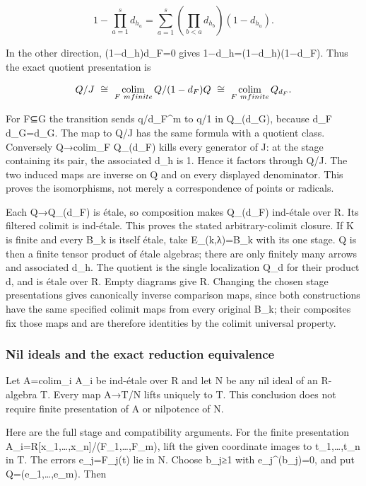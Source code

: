 \[
1-\prod_{a=1}^s d_{h_a}
 =\sum_{a=1}^s\left(\prod_{b<a}d_{h_b}\right)(1-d_{h_a}).
\]

In the other direction, (1−d\_h)d\_F=0 gives 1−d\_h=(1−d\_h)(1−d\_F). Thus the exact quotient presentation is

\[
Q/J\ \cong\ \mathop{\rm colim}_{F\ {m finite}}
     Q/(1-d_F)Q
\ \cong\ \mathop{\rm colim}_{F\ {m finite}} Q_{d_F}.
\]

For F⊆G the transition sends q/d\_F\^{}m to q/1 in Q\_(d\_G), because d\_F d\_G=d\_G. The map to Q/J has the same formula with a quotient class. Conversely Q→colim\_F Q\_(d\_F) kills every generator of J: at the stage containing its pair, the associated d\_h is 1. Hence it factors through Q/J. The two induced maps are inverse on Q and on every displayed denominator. This proves the isomorphisms, not merely a correspondence of points or radicals.

Each Q→Q\_(d\_F) is étale, so composition makes Q\_(d\_F) ind-étale over R. Its filtered colimit is ind-étale. This proves the stated arbitrary-colimit closure. If K is finite and every B\_k is itself étale, take E\_(k,λ)=B\_k with its one stage. Q is then a finite tensor product of étale algebras; there are only finitely many arrows and associated d\_h. The quotient is the single localization Q\_d for their product d, and is étale over R. Empty diagrams give R. Changing the chosen stage presentations gives canonically inverse comparison maps, since both constructions have the same specified colimit maps from every original B\_k; their composites fix those maps and are therefore identities by the colimit universal property.

\subsubsection{Nil ideals and the exact reduction equivalence}\label{algebra-proof-059-nil-ideals-and-the-exact-reduction-equivalence}

Let A=colim\_i A\_i be ind-étale over R and let N be any nil ideal of an R-algebra T. Every map A→T/N lifts uniquely to T. This conclusion does not require finite presentation of A or nilpotence of N.

Here are the full stage and compatibility arguments. For the finite presentation A\_i=R{[}x\_1,\ldots,x\_n{]}/(F\_1,\ldots,F\_m), lift the given coordinate images to t\_1,\ldots,t\_n in T. The errors e\_j=F\_j(t) lie in N. Choose b\_j≥1 with e\_j\^{}(b\_j)=0, and put Q=(e\_1,\ldots,e\_m). Then

